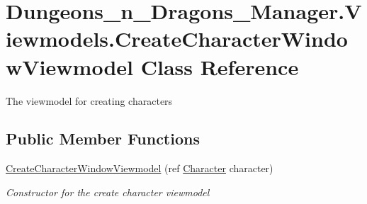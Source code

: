 \hypertarget{class_dungeons__n___dragons___manager_1_1_viewmodels_1_1_create_character_window_viewmodel}{}\section{Dungeons\+\_\+n\+\_\+\+Dragons\+\_\+\+Manager.\+Viewmodels.\+Create\+Character\+Window\+Viewmodel Class Reference}
\label{class_dungeons__n___dragons___manager_1_1_viewmodels_1_1_create_character_window_viewmodel}


The viewmodel for creating characters  


\subsection*{Public Member Functions}
\begin{DoxyCompactItemize}
\item 
\mbox{\hyperlink{class_dungeons__n___dragons___manager_1_1_viewmodels_1_1_create_character_window_viewmodel_ae964b05d5a56ee6d4782e6a70ae3b139}{Create\+Character\+Window\+Viewmodel}} (ref \mbox{\hyperlink{class_dungeons__n___dragons___manager_1_1_models_1_1_character}{Character}} character)
\begin{DoxyCompactList}\small\item\em Constructor for the create character viewmodel \end{DoxyCompactList}\end{DoxyCompactItemize}
